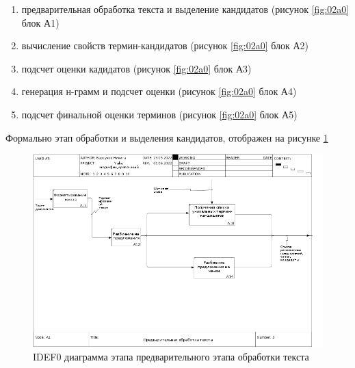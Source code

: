 \begin{enumerate}
	\item предварительная обработка текста и выделение кандидатов (рисунок \ref{fig:02a0} блок А1)
	\item вычисление свойств термин-кандидатов (рисунок \ref{fig:02a0} блок А2)
	\item подсчет оценки кадидатов (рисунок \ref{fig:02a0} блок А3)
	\item генерация н-грамм и подсчет оценки (рисунок \ref{fig:02a0} блок А4)
	\item подсчет финальной оценки терминов (рисунок \ref{fig:02a0} блок А5)
\end{enumerate}

Формально этап обработки и выделения кандидатов, отображен на рисунке \ref{fig:03a1}
\begin{figure}[!h]
	\centering
	\includegraphics[width=1\linewidth]{src/img/idef0/Yake/03_A1}
	\caption{IDEF0 диаграмма этапа предварительного этапа обработки текста}
	\label{fig:03a1}
\end{figure}

